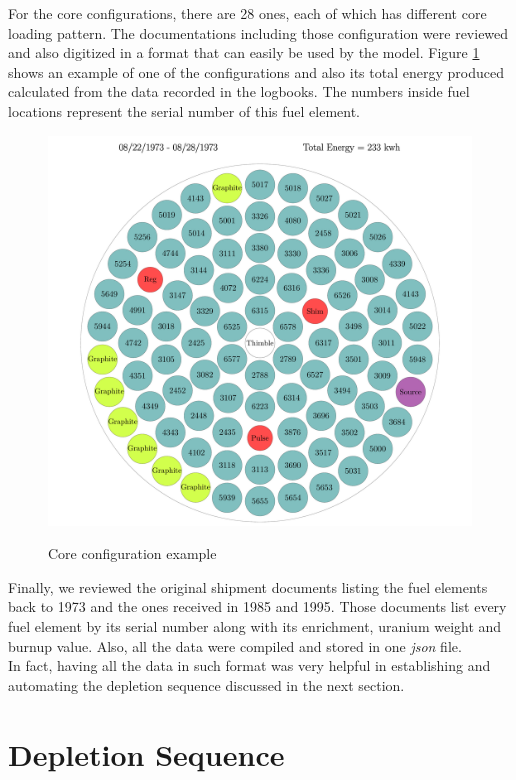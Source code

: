 \documentclass[review,number,sort&compress,12pt]{elsarticle}
\begin{document}
For the core configurations, there are 28 ones, each of which has different core loading pattern. The documentations including those configuration were reviewed and also digitized in a format that can easily be used by the model.
Figure \ref{fig:coreii1_config} shows an example of one of the configurations and also its total energy produced calculated from the data recorded in the logbooks. The numbers inside fuel locations represent the serial number of this fuel element.

\begin{figure}[htp]
\centering
\includegraphics[scale=0.3]{coreii1.pdf}\\
\caption{Core configuration example}
\label{fig:coreii1_config}
\end{figure}

Finally, we reviewed the original shipment documents listing the fuel elements back to 1973 and the ones received in 1985 and 1995. Those documents list every fuel element by its serial number along with its enrichment, uranium weight and burnup value. Also, all the data were compiled and stored in one \emph{json} file.\\
In fact, having all the data in such format was very helpful in establishing and automating the depletion sequence discussed in the next section.


\section{Depletion Sequence}
\end{document}

